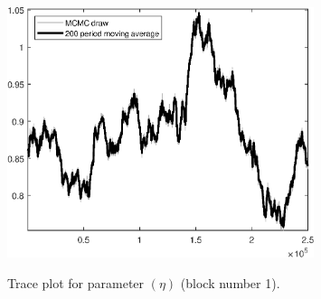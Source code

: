 \begin{figure}[H]
\centering
  \includegraphics[width=0.8\textwidth]{BRS_comovement/graphs/TracePlot_eta_blck_1}\\
    \caption{Trace plot for parameter $(\eta)$ (block number 1).}
\end{figure}
